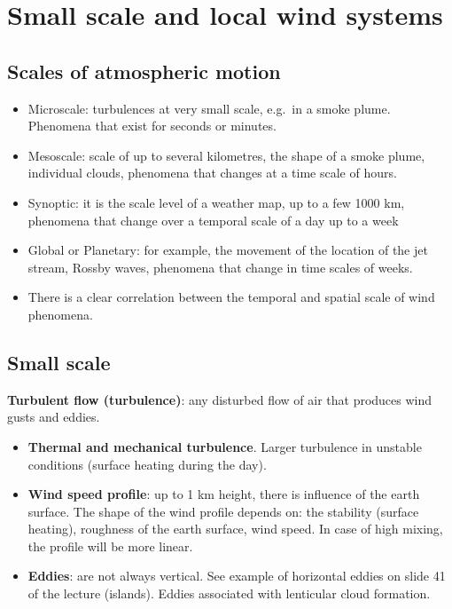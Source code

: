 \documentclass[oneside]{book}
\providecommand{\tightlist}{%
  \setlength{\itemsep}{0pt}\setlength{\parskip}{0pt}}
\begin{document}
\section{Small scale and local wind
systems}\label{small-scale-and-local-wind-systems}

\subsection{Scales of atmospheric
motion}\label{scales-of-atmospheric-motion}

\begin{itemize}
\tightlist
\item
  Microscale: turbulences at very small scale, e.g.~in a smoke plume.
  Phenomena that exist for seconds or minutes.\\
\item
  Mesoscale: scale of up to several kilometres, the shape of a smoke
  plume, individual clouds, phenomena that changes at a time scale of
  hours.
\item
  Synoptic: it is the scale level of a weather map, up to a few 1000 km,
  phenomena that change over a temporal scale of a day up to a week\\
\item
  Global or Planetary: for example, the movement of the location of the
  jet stream, Rossby waves, phenomena that change in time scales of
  weeks.
\item
  There is a clear correlation between the temporal and spatial scale of
  wind phenomena.
\end{itemize}

\subsection{Small scale}\label{small-scale}

\textbf{Turbulent flow (turbulence)}: any disturbed flow of air that
produces wind gusts and eddies.

\begin{itemize}
\item
  \textbf{Thermal and mechanical turbulence}. Larger turbulence in
  unstable conditions (surface heating during the day).
\item
  \textbf{Wind speed profile}: up to 1 km height, there is influence of
  the earth surface. The shape of the wind profile depends on: the
  stability (surface heating), roughness of the earth surface, wind
  speed. In case of high mixing, the profile will be more linear.
\item
  \textbf{Eddies}: are not always vertical. See example of horizontal
  eddies on slide 41 of the lecture (islands). Eddies associated with
  lenticular cloud formation.
\end{itemize}
\end{document}
